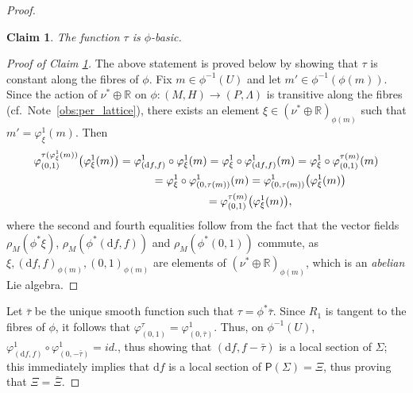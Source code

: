 \documentclass[pdftex]{sigma}
\numberwithin{equation}{section}
\newtheorem{Claim}[Theorem]{Claim}
\newcommand{\de}{\mathrm{d}} %
\newcommand{\CM}{(M,H)} %
\newcommand{\PM}{(P,\Lambda)} %
\newcommand{\RR}{\mathbb{R}}
\begin{document}
\begin{proof}
 \begin{Claim}\label{claim:basic}
 The function $\tau$ is $\phi$-basic.
 \end{Claim}
\begin{proof}[Proof of Claim \ref{claim:basic}] The above statement is proved below by showing that $\tau$ is constant along the f\/ibres of $\phi$. Fix $m \in \phi^{-1}(U)$ and let $m' \in \phi^{-1}(\phi(m))$. Since the action of $\nu^* \oplus \RR$ on $\phi \colon \CM \to \PM$ is transitive along the f\/ibres (cf.\ Note~\ref{obs:per_lattice}), there exists an element $\xi \in (\nu^* \oplus \RR )_{\phi(m)}$ such that $m' = \varphi^1_{\xi}(m)$. Then
 \begin{gather*} %
 \varphi^{\tau (\varphi^1_{\xi}(m) )}_{(0,1)} \big(\varphi^1_{\xi}(m) \big) = \varphi^1_{(\de f, f)}\circ \varphi^1_{\xi}(m) =
 \varphi^1_{\xi} \circ \varphi^1_{(\de f, f)}(m) = \varphi^1_{\xi} \circ \varphi^{\tau(m)}_{(0,1)}(m) \\
\hphantom{\varphi^{\tau (\varphi^1_{\xi}(m) )}_{(0,1)} \big(\varphi^1_{\xi}(m) \big)}{} = \varphi^1_{\xi} \circ \varphi^{1}_{(0,\tau(m))}(m) =
 \varphi^{1}_{(0,\tau(m))} \big(\varphi^1_{\xi}(m)\big) \\
\hphantom{\varphi^{\tau (\varphi^1_{\xi}(m) )}_{(0,1)} \big(\varphi^1_{\xi}(m) \big)}{} = \varphi^{\tau(m)}_{(0,1)} \big(\varphi^1_{\xi}(m) \big) ,
 \end{gather*}
where the second and fourth equalities follow from the fact that the vector f\/ields $\rho_M(\phi^*\xi)$, $\rho_M(\phi^*(\de f,f))$ and $\rho_M(\phi^*(0,1))$ commute, as $\xi, (\de f,f)_{\phi(m)}, (0,1)_{\phi(m)}$ are elements of $(\nu^* \oplus \RR)_{\phi(m)}$, which is an {\it abelian} Lie algebra.
 \end{proof}

Let $\bar{\tau}$ be the unique smooth function such that $\tau = \phi^*\bar{\tau}$. Since $R_1$ is tangent to the f\/ibres of $\phi$, it follows that $\varphi^{\tau}_{(0,1)} = \varphi^1_{(0,\bar{\tau})}$. Thus, on $\phi^{-1}(U)$, $\varphi^1_{(\de f,f)} \circ \varphi^1_{(0,-\bar{\tau})} = id.$, thus showing that $(\de f, f - \bar{\tau})$ is a local section of $\Sigma$; this immediately implies that $\de f$ is a local section of $\mathsf{P}(\Sigma) =\Xi$, thus proving that $\Xi = \bar{\Xi}$.


\end{proof}
\end{document}
